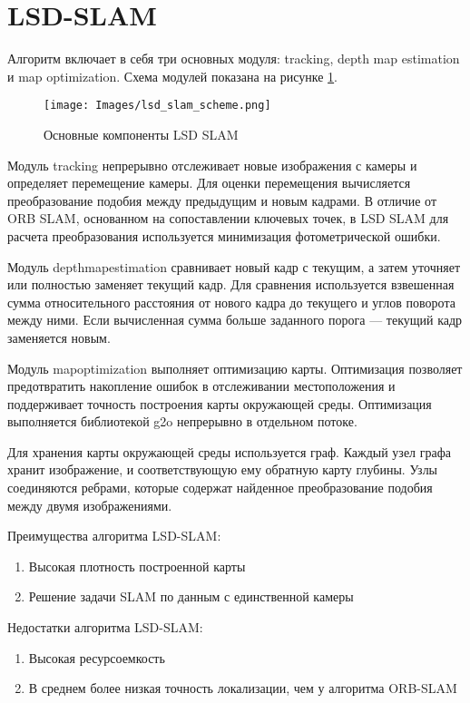 \documentclass{mipt-thesis-bs}
\begin{document}
\section{LSD-SLAM}
Алгоритм \cite{engel2014lsd} включает в себя три основных модуля: tracking, depth map estimation и map optimization. Схема модулей показана на рисунке \ref{figurelsdslam}.

\begin{figure}
	\centering
	\texttt{[image: Images/lsd\_slam\_scheme.png]}
	\caption{Основные компоненты LSD SLAM}
	\label{figurelsdslam}
\end{figure}

Модуль tracking непрерывно отслеживает новые изображения с камеры и определяет перемещение камеры. Для оценки перемещения вычисляется преобразование подобия между предыдущим и новым кадрами. В отличие от ORB SLAM, основанном на сопоставлении ключевых точек, в LSD SLAM для расчета преобразования используется минимизация фотометрической ошибки.

Модуль depthmapestimation сравнивает новый кадр с текущим, а затем уточняет или полностью заменяет текущий кадр. Для сравнения используется взвешенная сумма относительного расстояния от нового кадра до текущего и углов поворота между ними. Если вычисленная сумма больше заданного порога — текущий кадр заменяется новым.

Модуль mapoptimization выполняет оптимизацию карты. Оптимизация позволяет предотвратить накопление ошибок в отслеживании местоположения и поддерживает точность построения карты окружающей среды. Оптимизация выполняется библиотекой g2o непрерывно в отдельном потоке.

Для хранения карты окружающей среды используется граф. Каждый узел графа хранит изображение, и соответствующую ему обратную карту глубины. Узлы соединяются ребрами, которые содержат найденное преобразование подобия между двумя изображениями.

Преимущества алгоритма LSD-SLAM:
\begin{enumerate}
	\item {Высокая плотность построенной карты}
	\item {Решение задачи SLAM по данным с единственной камеры}
\end{enumerate}
Недостатки алгоритма LSD-SLAM:
\begin{enumerate}
	\item {Высокая ресурсоемкость}
	\item {В среднем более низкая точность локализации, чем у алгоритма ORB-SLAM}
\end{enumerate}
\end{document}
